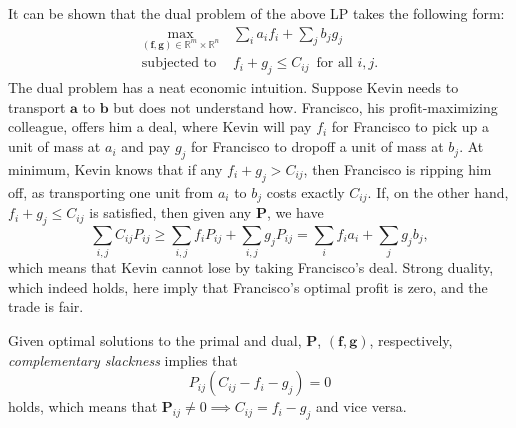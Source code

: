 \documentclass[11pt]{amsart}
\renewcommand{\b}{\mathbf}
\newcommand{\R}{\mathbb{R}}
\theoremstyle{remark}
\begin{document}
    It can be shown that the dual problem of the above LP takes the following
    form: \begin{align*}
    \max_{(\b f, \b g) \in \R^{m} \times \R^n} \, & \sum_i a_i f_i + \sum_j b_j
    g_j
    \\ 
    \text{subjected to } & f_i + g_j \le C_{ij}\, \text{ for all $i,j$}.
    \end{align*}
    The dual problem has a neat economic intuition. Suppose Kevin needs to
    transport $\b a$ to $\b b$ but does not understand how. Francisco, his
    profit-maximizing colleague, offers him a deal, where Kevin will pay $f_i$
    for Francisco to
    pick up a unit of mass at $a_i$ and pay $g_j$ for Francisco to dropoff a
    unit of mass at $b_j.$ At minimum, Kevin knows that if any $f_i + g_j > C_
    {ij}$, then Francisco is ripping him off, as transporting one unit from
    $a_i$ to $b_j$ costs exactly $C_{ij}$. If, on the other hand, $f_i + g_j
    \le C_{ij}$ is satisfied, then given any $\b P$, we have \[
    \sum_{i,j} C_{ij}P_{ij} \ge \sum_{i,j} f_i P_{ij} + \sum_{i,j} g_j P_{ij} =
    \sum_i f_i a_i + \sum_j g_j b_j \tag{Weak duality},
    \]
    which means that Kevin cannot lose by taking Francisco's deal. Strong
    duality, which indeed holds, here imply that Francisco's optimal profit is
    zero, and the trade is fair.
    
    
    Given optimal solutions to the primal and dual, $\b P$, $(\b f, \b g)$,
    respectively, \emph{complementary slackness} implies that \[
    P_{ij} (C_{ij} - f_i - g_j) = 0
    \]
    holds, which means that $\b P_{ij} \neq 0 \implies C_{ij} = f_i - g_j$ and
    vice versa.
    
\end{document}
